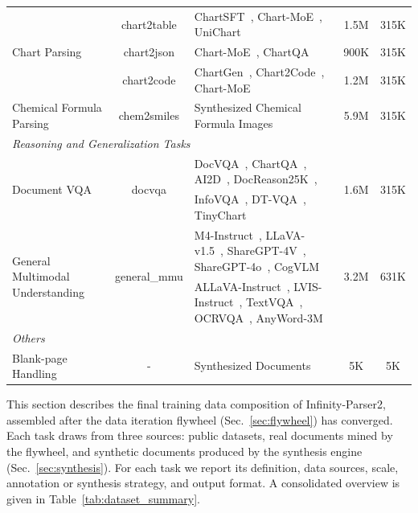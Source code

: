\begin{table}[t]
{\begin{tabular}{l|c|l|c|c}
\midrule
\multirow{3}{*}{Chart Parsing}
  & chart2table & ChartSFT~\cite{chartsft}, Chart-MoE~\cite{chartmoe}, UniChart~\cite{unichart}                             & 1.5M & 315K \\
  & chart2json  & Chart-MoE~\cite{chartmoe}, ChartQA~\cite{chartqa}                                        & 900K & 315K \\
  & chart2code  & ChartGen~\cite{chartgen}, Chart2Code~\cite{chart2code}, Chart-MoE~\cite{chartmoe}                           & 1.2M & 315K \\
\midrule
Chemical Formula Parsing & chem2smiles & Synthesized Chemical Formula Images & 5.9M & 315K \\
\midrule
\multicolumn{5}{l}{\textit{Reasoning and Generalization Tasks}} \\
\midrule
\multirow{2}{*}{Document VQA} & \multirow{2}{*}{docvqa} & DocVQA~\cite{docvqa}, ChartQA~\cite{chartqa}, AI2D~\cite{ai2d}, DocReason25K~\cite{docreason25k},& \multirow{2}{*}{1.6M} & \multirow{2}{*}{315K} \\
& & InfoVQA~\cite{infovqa}, DT-VQA~\cite{dtvqa}, TinyChart~\cite{tinychart} & & \\
\midrule
\multirow{2}{*}{General Multimodal Understanding} & \multirow{2}{*}{general\_mmu} & M4-Instruct~\cite{m4instruct}, LLaVA-v1.5~\cite{llava15}, ShareGPT-4V~\cite{sharegpt4v}, ShareGPT-4o~\cite{sharegpt4o}, CogVLM~\cite{cogvlm} & \multirow{2}{*}{3.2M} & \multirow{2}{*}{631K} \\
& & ALLaVA-Instruct~\cite{allava}, LVIS-Instruct~\cite{lvisinstruct4v}, TextVQA~\cite{textvqa}, OCRVQA~\cite{ocrvqa}, AnyWord-3M~\cite{anyword3m} & & \\
\midrule
\multicolumn{5}{l}{\textit{Others}} \\
\midrule
Blank-page Handling & - & Synthesized Documents & 5K & 5K \\
\bottomrule
\end{tabular}%
}
\end{table}

This section describes the final training data composition of Infinity-Parser2, assembled after the data iteration flywheel (Sec.~\ref{sec:flywheel}) has converged. Each task draws from three sources: public datasets, real documents mined by the flywheel, and synthetic documents produced by the synthesis engine (Sec.~\ref{sec:synthesis}). For each task we report its definition, data sources, scale, annotation or synthesis strategy, and output format. A consolidated overview is given in Table~\ref{tab:dataset_summary}.

